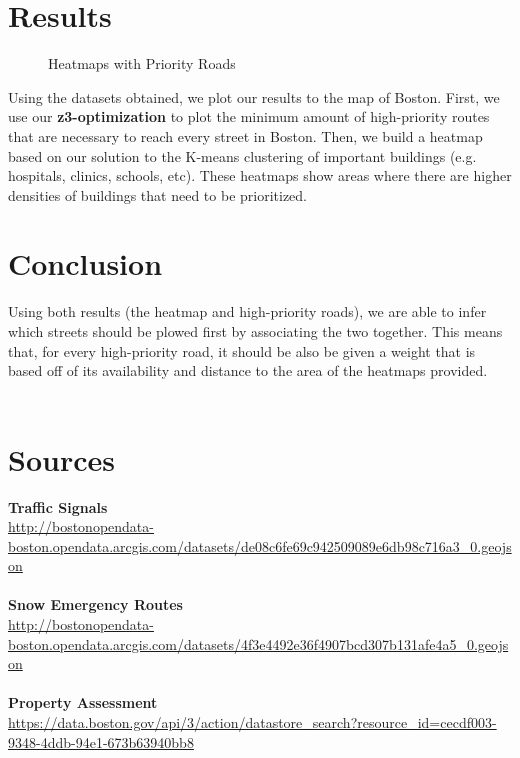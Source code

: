 \documentclass[15pt]{report}
\begin{document}
\section*{Results}
\begin{figure}[h!]
	\centering
	\caption{Heatmaps with Priority Roads}
	\label{fig:method}
\end{figure} 
\noindent Using the datasets obtained, we plot our results to the map of Boston. First, we use our \textbf{z3-optimization} to plot the minimum amount of high-priority routes that are necessary to reach every street in Boston. Then, we build a heatmap based on our solution to the K-means clustering of important buildings (e.g. hospitals, clinics, schools, etc). These heatmaps show areas where there are higher densities of buildings that need to be prioritized.

\section*{Conclusion}
Using both results (the heatmap and high-priority roads), we are able to infer which streets should be plowed first by associating the two together. This means that, for every high-priority road, it should be also be given a weight that is based off of its availability and distance to the area of the heatmaps provided. \\\\
\section*{Sources}
\sloppy 
\textbf{Traffic Signals} \\
\url{http://bostonopendata-boston.opendata.arcgis.com/datasets/de08c6fe69c942509089e6db98c716a3_0.geojson} \\\\
\textbf{Snow Emergency Routes} \\
\url{http://bostonopendata-boston.opendata.arcgis.com/datasets/4f3e4492e36f4907bcd307b131afe4a5_0.geojson} \\\\
\textbf{Property Assessment} \\
\url{https://data.boston.gov/api/3/action/datastore_search?resource_id=cecdf003-9348-4ddb-94e1-673b63940bb8}
\end{document}
